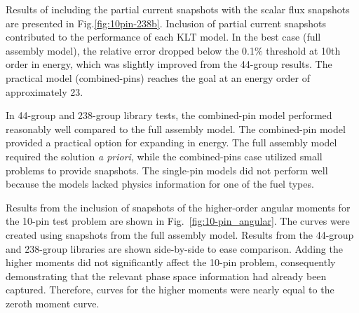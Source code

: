 \documentclass[5p,times,twocolumn,10pt]{elsarticle}
\begin{document}
    Results of including the partial current snapshots with the scalar flux
    snapshots are presented in Fig.\ref{fig:10pin-238b}.
    Inclusion of partial current snapshots contributed to the performance of
    each KLT model.
    In the best case (full assembly model), the relative error dropped below
    the 0.1$\%$ threshold at 10th order in energy, which was slightly improved
    from the 44-group results. The practical model (combined-pins) reaches the
    goal at an energy order of approximately 23.

    In 44-group and 238-group library tests, the combined-pin model performed
    reasonably well compared to the full assembly model.  The combined-pin
    model provided a practical option for expanding in energy.  The full
    assembly model required the solution {\it a priori}, while the
    combined-pins case utilized small problems to provide snapshots.  The
    single-pin
    models did not perform well because the models
    lacked physics information for one of the fuel types.

    Results from the inclusion of snapshots of the higher-order angular moments
    for the 10-pin test problem are shown in Fig.~\ref{fig:10-pin_angular}.
    The curves
    were created using snapshots from the full assembly model.  Results from
    the 44-group and 238-group libraries are shown side-by-side to ease
    comparison.  Adding the higher moments did not significantly affect the
    10-pin problem, consequently demonstrating that the relevant phase space
    information had already been captured. Therefore, curves for the higher
    moments were nearly equal to the zeroth moment curve.
\end{document}
